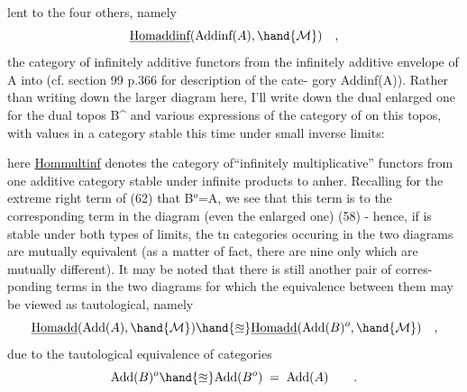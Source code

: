 
lent to the four others,  namely 
\[ \underline{\text{Homaddinf}}(\text{Addinf}(A),\hand{\mathcal{M}}) \quad , \]
the category of infinitely additive functors from the infinitely additive
envelope of A into  (cf.  section 99 p.366 for description of the cate-%
gory Addinf(A)).  Rather than writing down the larger diagram here,  I'll
write down the dual enlarged one\hand{,} for the  dual topos B\^{} and  various
expressions of the category of \hand{\uline{\textcolor{black}{sheaves}}} on this topos,  with values in a
category  stable this time under small inverse limits:

here \uline{Hommultinf}  denotes the category of``infinitely multiplicative''
functors from one additive category stable under infinite products to
anher.  Recalling for the extreme right term of (62) that B$^{o}$=A,  we see
that this term is \hand{\uline{\textcolor{black}{identic}}} to the corresponding term in the diagram (even
the enlarged one) (58)  -  hence,  if  is stable under both types of
limits,  the tn categories occuring  in the two diagrams are mutually
equivalent (as a matter of fact,  there are nine only which are mutually
different).  It may be noted that there is still another pair of corres-%
ponding terms in the two diagrams for which the equivalence between them
may be viewed as tautological,  namely
\[ \underline{\text{Homadd}}(\text{Add}(A),\hand{\mathcal{M}}) \hand{\approxeq} \underline{\text{Homadd}}(\text{Add}(B)^{o},\hand{\mathcal{M}}) \quad , \]
due to the tautological equivalence of categories
\[ \text{Add}(B)^{o} \hand{\approxeq} \text{Add}(B^{o}) \;=\; \text{Add}(A) \qquad . \]

